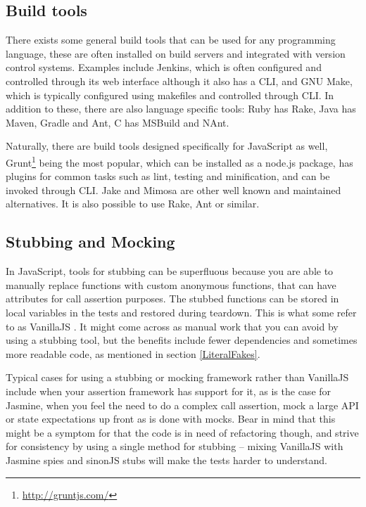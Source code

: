 \documentclass[11pt]{article}
\begin{document}
\subsection{Build tools} %

There exists some general build tools that can be used for any programming language, these are often installed on build servers and integrated with version control systems. Examples include Jenkins, which is often configured and controlled through its web interface although it also has a CLI, and GNU Make, which is typically configured using makefiles and controlled through CLI. In addition to these, there are also language specific tools: Ruby has Rake, Java has Maven, Gradle and Ant, C\nolinebreak\hspace{-.05em}\raisebox{.3ex}{\scriptsize\bf \#} has MSBuild and NAnt.

Naturally, there are build tools designed specifically for JavaScript as well, Grunt\footnote{\url{http://gruntjs.com/}} being the most popular, which can be installed as a node.js package, has plugins for common tasks such as lint, testing and minification, and can be invoked through CLI. \cite[question~52]{Edelstam} Jake and Mimosa are other well known and maintained alternatives. It is also possible to use Rake, Ant or similar. \cite{BuildTools}

\subsection{Stubbing and Mocking} %

In JavaScript, tools for stubbing can be superfluous because you are able to manually replace functions with custom anonymous functions, that can have attributes for call assertion purposes. The stubbed functions can be stored in local variables in the tests and restored during teardown. This is what some refer to as VanillaJS \cite[question~53]{Edelstam}. It might come across as manual work that you can avoid by using a stubbing tool, but the benefits include fewer dependencies and sometimes more readable code, as mentioned in section \ref{LiteralFakes}. \cite[questions~54-55]{Edelstam}

Typical cases for using a stubbing or mocking framework rather than VanillaJS include when your assertion framework has support for it, as is the case for Jasmine, when you feel the need to do a complex call assertion, mock a large API or state expectations up front as is done with mocks. Bear in mind that this might be a symptom for that the code is in need of refactoring though, and strive for consistency by using a single method for stubbing -- mixing VanillaJS with Jasmine spies and sinonJS stubs will make the tests harder to understand.
\end{document}
